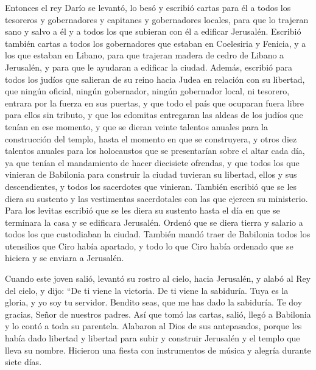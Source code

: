  Entonces el rey Darío se levantó, lo besó y escribió
cartas para él a todos los tesoreros y gobernadores y capitanes y
gobernadores locales, para que lo trajeran sano y salvo a él y a todos
los que subieran con él a edificar Jerusalén.  Escribió
también cartas a todos los gobernadores que estaban en Coelesiria y
Fenicia, y a los que estaban en Libano, para que trajeran madera de
cedro de Libano a Jerusalén, y para que le ayudaran a edificar la
ciudad.  Además, escribió para todos los judíos que
salieran de su reino hacia Judea en relación con su libertad, que ningún
oficial, ningún gobernador, ningún gobernador local, ni tesorero,
entrara por la fuerza en sus puertas,  y que todo el país
que ocuparan fuera libre para ellos sin tributo, y que los edomitas
entregaran las aldeas de los judíos que tenían en ese momento,
 y que se dieran veinte talentos anuales para la
construcción del templo, hasta el momento en que se construyera,
 y otros diez talentos anuales para los holocaustos que
se presentarían sobre el altar cada día, ya que tenían el mandamiento de
hacer diecisiete ofrendas,  y que todos los que vinieran
de Babilonia para construir la ciudad tuvieran su libertad, ellos y sus
descendientes, y todos los sacerdotes que vinieran. 
También escribió que se les diera su sustento y las vestimentas
sacerdotales con las que ejercen su ministerio.  Para los
levitas escribió que se les diera su sustento hasta el día en que se
terminara la casa y se edificara Jerusalén.  Ordenó que
se diera tierra y salario a todos los que custodiaban la ciudad.
 También mandó traer de Babilonia todos los utensilios
que Ciro había apartado, y todo lo que Ciro había ordenado que se
hiciera y se enviara a Jerusalén.

 Cuando este joven salió, levantó su rostro al cielo,
hacia Jerusalén, y alabó al Rey del cielo,  y dijo: ``De
ti viene la victoria. De ti viene la sabiduría. Tuya es la gloria, y yo
soy tu servidor.  Bendito seas, que me has dado la
sabiduría. Te doy gracias, Señor de nuestros padres.  Así
que tomó las cartas, salió, llegó a Babilonia y lo contó a toda su
parentela.  Alabaron al Dios de sus antepasados, porque
les había dado libertad y libertad  para subir y
construir Jerusalén y el templo que lleva su nombre. Hicieron una fiesta
con instrumentos de música y alegría durante siete días.

